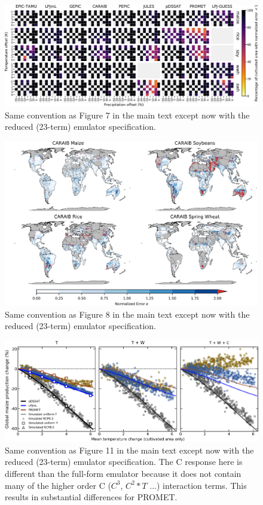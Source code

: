 \documentclass[12pt]{article}
\begin{document}
{{\begin{figure}[h!]
  \centering
  \includegraphics[width=15.5cm]{reduced_error_grid.png}
  \caption{
  Same convention as Figure 7 in the main text except now with the reduced (23-term) emulator specification.
  }
  \label{fig:reducedgrid}
\end{figure}

\begin{figure}[h!]
  \centering
  \includegraphics[width=15.5cm]{reduced_CARAIB_spatial_error.png}
  \caption{
  Same convention as Figure 8 in the main text except now with the reduced (23-term) emulator specification.
  }
  \label{fig:reducedcaraib}
\end{figure}

\begin{figure}[h!]
  \centering
  \includegraphics[width = 16.3cm]{reduced_global_em_maize.png}
  \caption{
  Same convention as Figure 11 in the main text except now with the reduced (23-term) emulator specification. The C response here is different than the full-form emulator because it does not contain many of the higher order C ($C^{3}$, $C^{2} * T$ ...) interaction terms. This results in substantial differences for PROMET. 
  }
\end{figure}

}}
\end{document}
